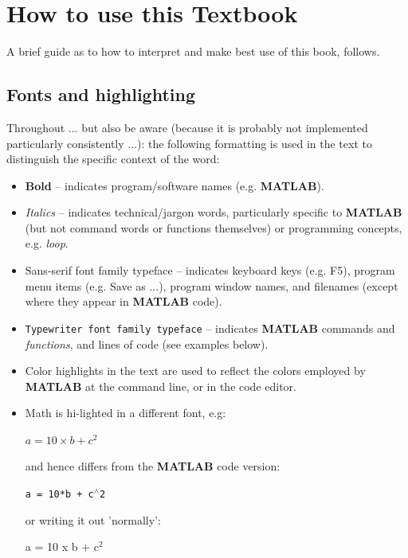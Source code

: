 \documentclass{tufte-book} %
\begin{document}
\cleardoublepage

\chapter{How to use this Textbook} %

A brief guide as to how to interpret and make best use of this book, follows.


\section{Fonts and highlighting}

Throughout ... but also be aware (because it is probably not implemented particularly consistently ...): the following formatting is used in the text to distinguish the specific context of the word:

\begin{itemize}[noitemsep]
\setlength{\itemindent}{.2in}

\item \textbf{Bold} -- indicates program/software names (e.g. \textbf{MATLAB}).

\item \textit{Italics} -- indicates technical/jargon words, particularly specific to \textbf{MATLAB} (but not command words or functions themselves) or programming concepts, e.g. \textit{loop}.

\item \textsf{Sans-serif font family typeface} -- indicates keyboard keys (e.g. \textsf{F5}), program menu items (e.g. \textsf{Save as ...}), program window names, and filenames (except where they appear in \textbf{MATLAB} code).

\item \texttt{Typewriter font family typeface} -- indicates \textbf{MATLAB} commands and \textit{functions}, and lines of code (see examples below).

\item Color highlights in the text are used to reflect the colors employed by \textbf{MATLAB} at the command line, or in the code editor.

\item Math is hi-lighted in a  different font, e.g:

\(a = 10\times b + c^{2}\)

and hence differs from the \textbf{MATLAB} code version:

\texttt{a = 10*b + c\(^{\wedge}\)2}

or writing it out 'normally':

a = 10 x b + c\(^{2}\)

\end{itemize}
\end{document}
